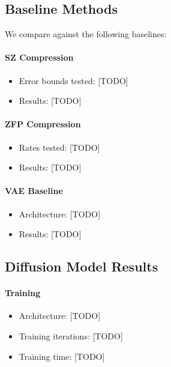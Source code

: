 \subsection{Baseline Methods}

We compare against the following baselines:

\paragraph{SZ Compression}
\begin{itemize}
    \item Error bounds tested: [TODO]
    \item Results: [TODO]
\end{itemize}

\paragraph{ZFP Compression}
\begin{itemize}
    \item Rates tested: [TODO]
    \item Results: [TODO]
\end{itemize}

\paragraph{VAE Baseline}
\begin{itemize}
    \item Architecture: [TODO]
    \item Results: [TODO]
\end{itemize}

% 

\subsection{Diffusion Model Results}


\paragraph{Training}
\begin{itemize}
    \item Architecture: [TODO]
    \item Training iterations: [TODO]
    \item Training time: [TODO]
\end{itemize}

